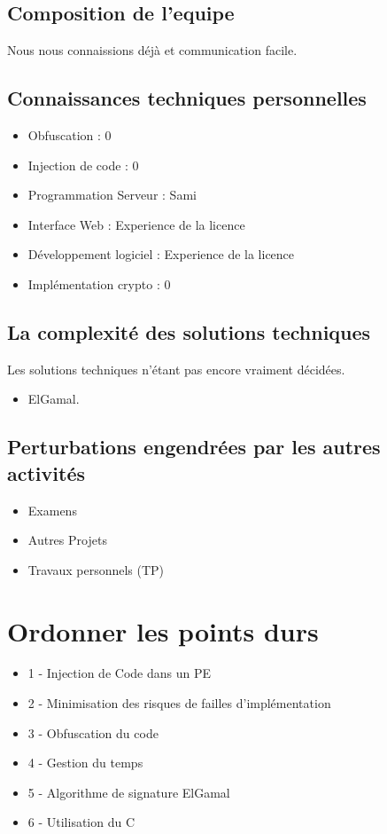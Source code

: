 \section{Composition de l'equipe}
Nous nous connaissions déjà et communication facile.

\section{Connaissances techniques personnelles}
\begin{itemize}
	\item Obfuscation : 0
	\item Injection de code : 0
	\item Programmation Serveur : Sami
	\item Interface Web : Experience de la licence 
	\item Développement logiciel : Experience de la licence
	\item Implémentation crypto : 0
\end{itemize}

\section{La complexité des solutions techniques}
Les solutions techniques n'étant pas encore vraiment décidées.
\begin{itemize}
	\item ElGamal.
\end{itemize}

\section{Perturbations engendrées par les autres activités}
\begin{itemize}
	\item Examens
	\item Autres Projets
	\item Travaux personnels (TP)
\end{itemize}

\chapter{Ordonner les points durs}
\begin{itemize}
	\item 1 - Injection de Code dans un PE
	\item 2 - Minimisation des risques de failles d'implémentation
	\item 3 - Obfuscation du code
	\item 4 - Gestion du temps
	\item 5 - Algorithme de signature ElGamal
	\item 6 - Utilisation du C
\end{itemize}

